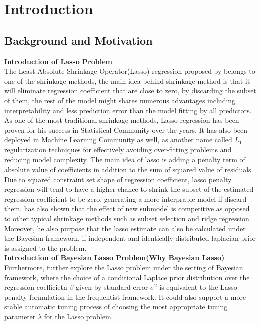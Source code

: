 \chapter{Introduction}
\label{Chapter1}
\section{Background and Motivation}



\textbf{Introduction of Lasso Problem}\\
The Least Absolute Shrinkage Operator(Lasso) regression proposed by \cite{tibshirani_1996} belongs to one of the shrinkage methods, the main idea behind shrinkage method is that it will eliminate regression coefficient that are close to zero, by discarding the subset of them, the rest of the model might shares numerous advantages including interpretability and less prediction error than the model fitting by all predictors. As one of the most traditional shrinkage methods, Lasso regression has been proven for his success in Statistical Community over the years. It has also been deployed in Machine Learning Community as well, as another name called $L_1$ regularization techniques for effectively avoiding over-fitting problems and reducing model complexity. The main idea of lasso is adding a penalty term of absolute value of coefficients in addition to the sum of squared value of residuals. Due to squared constraint set shape of regression coefficient, lasso penalty regression will tend to have a higher chance to shrink the subset of the estimated regression coefficient to be zero, generating a more interprable model if discard them. \cite{tibshirani_1996} has also shown that the effect of new submodel is competitive as opposed to other typical shrinkage methods such as subset selection and ridge regression. \\
Moreover, he also purpose that the lasso estimate can also be calculated under the Bayesian framework, if independent and identically distributed laplacian prior is assigned to the problem.\\


\textbf{Introduction of Bayesian Lasso Problem(Why Bayesian Lasso)}
Furthermore, \cite{park_casella_2008} further explore the Lasso problem under the setting of Bayesian framework, where the choice of a conditional Laplace prior distribution over the regression coefficietn $\beta$ given by standard error $\sigma^2$ is equivalent to the Lasso penalty formulation in the frequentist framework. It could also support a more stable automatic tuning process of choosing the most appropriate tuning parameter $\lambda$ for the Lasso problem. 






